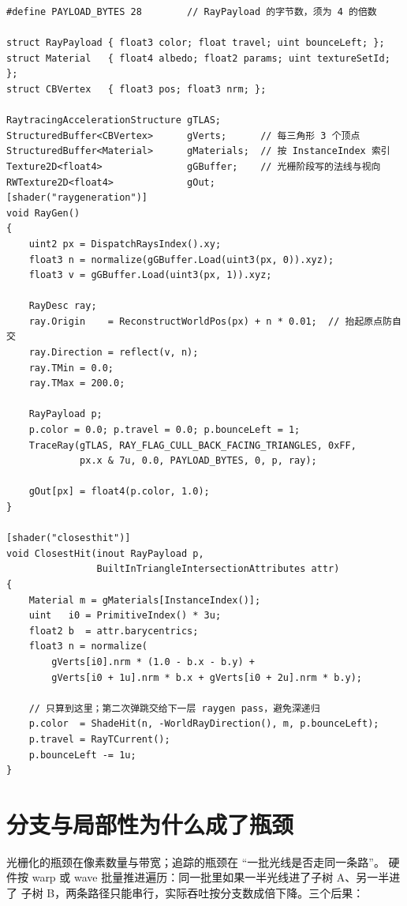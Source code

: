 \documentclass[12pt,a4paper,fontset=fandol]{ctexbook}
\begin{document}
\begin{lstlisting}[style=hlslstyle,caption={DXR 的 raygen 与 closest-hit：反射一次弹跳，材质表按实例索引取},label={lst:ch13-hlsl}]
#define PAYLOAD_BYTES 28        // RayPayload 的字节数，须为 4 的倍数

struct RayPayload { float3 color; float travel; uint bounceLeft; };
struct Material   { float4 albedo; float2 params; uint textureSetId; };
struct CBVertex   { float3 pos; float3 nrm; };

RaytracingAccelerationStructure gTLAS;
StructuredBuffer<CBVertex>      gVerts;      // 每三角形 3 个顶点
StructuredBuffer<Material>      gMaterials;  // 按 InstanceIndex 索引
Texture2D<float4>               gGBuffer;    // 光栅阶段写的法线与视向
RWTexture2D<float4>             gOut;
[shader("raygeneration")]
void RayGen()
{
    uint2 px = DispatchRaysIndex().xy;
    float3 n = normalize(gGBuffer.Load(uint3(px, 0)).xyz);
    float3 v = gGBuffer.Load(uint3(px, 1)).xyz;

    RayDesc ray;
    ray.Origin    = ReconstructWorldPos(px) + n * 0.01;  // 抬起原点防自交
    ray.Direction = reflect(v, n);
    ray.TMin = 0.0;
    ray.TMax = 200.0;

    RayPayload p;
    p.color = 0.0; p.travel = 0.0; p.bounceLeft = 1;
    TraceRay(gTLAS, RAY_FLAG_CULL_BACK_FACING_TRIANGLES, 0xFF,
             px.x & 7u, 0.0, PAYLOAD_BYTES, 0, p, ray);

    gOut[px] = float4(p.color, 1.0);
}

[shader("closesthit")]
void ClosestHit(inout RayPayload p,
                BuiltInTriangleIntersectionAttributes attr)
{
    Material m = gMaterials[InstanceIndex()];
    uint   i0 = PrimitiveIndex() * 3u;
    float2 b  = attr.barycentrics;
    float3 n = normalize(
        gVerts[i0].nrm * (1.0 - b.x - b.y) +
        gVerts[i0 + 1u].nrm * b.x + gVerts[i0 + 2u].nrm * b.y);

    // 只算到这里；第二次弹跳交给下一层 raygen pass，避免深递归
    p.color  = ShadeHit(n, -WorldRayDirection(), m, p.bounceLeft);
    p.travel = RayTCurrent();
    p.bounceLeft -= 1u;
}
\end{lstlisting}

\section{分支与局部性为什么成了瓶颈}

光栅化的瓶颈在像素数量与带宽；追踪的瓶颈在 ``一批光线是否走同一条路''。
硬件按 warp 或 wave 批量推进遍历：同一批里如果一半光线进了子树 A、另一半进了
子树 B，两条路径只能串行，实际吞吐按分支数成倍下降。三个后果：
\end{document}
